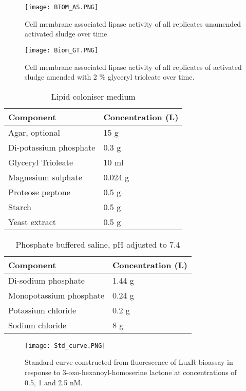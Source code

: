 \documentclass[11pt]{article}
\begin{document}
\begin{figure}
\texttt{[image: BIOM\_AS.PNG]}
\caption{Cell membrane associated lipase activity of all replicates unamended activated sludge over time}
\end{figure}

\begin{figure}
\texttt{[image: Biom\_GT.PNG]}
\caption{Cell membrane associated lipase activity of all replicates of activated sludge amended with 2 \% glyceryl trioleate over time.}
\end{figure}
\FloatBarrier

\begin{table}
\caption{Lipid coloniser medium}
\begin{tabular}{  p{6.9cm} | p{6.9cm} }
\hline
Component & Concentration (L) \\
\hline
Agar, optional  & 15 g  \\
  Di-potassium phosphate  & 0.3 g \\
   Glyceryl Trioleate   & 10 ml \\
      Magnesium sulphate  & 0.024 g  \\
       Proteose peptone   & 0.5 g \\
          Starch  & 0.5 g \\
           Yeast extract   & 0.5 g \\
  \hline
\end{tabular}
\end{table}


\begin{table}
\caption{Phosphate buffered saline, pH adjusted to 7.4}
\begin{tabular}{  p{6.9cm} | p{6.9cm}  }
\hline
Component & Concentration (L) \\
\hline
Di-sodium phosphate  & 1.44 g \\
  Monopotassium phosphate  & 0.24 g  \\
    Potassium chloride  &  0.2 g  \\
      Sodium chloride  & 8 g  \\
  \hline
\end{tabular}
\end{table}

\begin{figure}
\texttt{[image: Std\_curve.PNG]}
\caption{Standard curve constructed from fluorescence of LuxR bioassay in response to 3-oxo-hexanoyl-homoserine lactone at concentrations of 0.5, 1 and 2.5 nM.}
\end{figure}
\FloatBarrier
\end{document}
